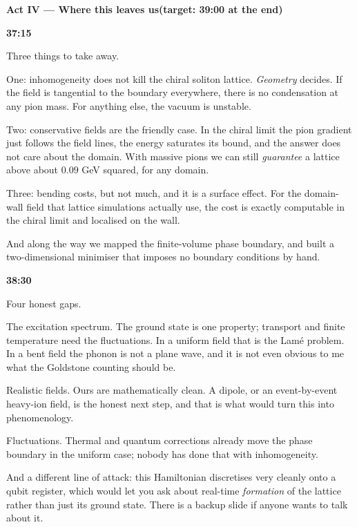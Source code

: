 \documentclass[11pt,a4paper]{article}
\newcommand{\slide}[3]{%
  \par\vspace{4.5mm}%
  \noindent{\color{myblue}\rule{\textwidth}{0.9pt}}\par\vspace{-2.0mm}%
  \noindent{\color{myblue}\bfseries\large #1}%
  \hfill{\color{myorange}\bfseries #2}\par\vspace{0.4mm}%
  \noindent{\color{mygray}\small\itshape #3}\par\vspace{1.6mm}%
}
\newcommand{\act}[1]{\par\vspace{7mm}\noindent
  {\color{myred}\bfseries\Large #1}\par\vspace{-1mm}
  \noindent{\color{myred}\rule{\textwidth}{1.6pt}}\par\vspace{2mm}}
\begin{document}
\act{Act IV --- Where this leaves us\hfill\normalsize\mdseries (target: 39:00 at the end)}

\slide{Summary}{37:15}{1 min 15 s}

Three things to take away.

One: inhomogeneity does not kill the chiral soliton lattice. \emph{Geometry}
decides. If the field is tangential to the boundary everywhere, there is no
condensation at any pion mass. For anything else, the vacuum is unstable.

Two: conservative fields are the friendly case. In the chiral limit the pion
gradient just follows the field lines, the energy saturates its bound, and the
answer does not care about the domain. With massive pions we can still \emph{guarantee}
a lattice above about $0.09$ GeV squared, for any domain.

Three: bending costs, but not much, and it is a surface effect. For the domain-wall
field that lattice simulations actually use, the cost is exactly computable in the
chiral limit and localised on the wall.

And along the way we mapped the finite-volume phase boundary, and built a
two-dimensional minimiser that imposes no boundary conditions by hand.

\slide{What we cannot do yet}{38:30}{1 min}

Four honest gaps.

The excitation spectrum. The ground state is one property; transport and finite
temperature need the fluctuations. In a uniform field that is the Lam\'e problem.
In a bent field the phonon is not a plane wave, and it is not even obvious to me
what the Goldstone counting should be.

Realistic fields. Ours are mathematically clean. A dipole, or an event-by-event
heavy-ion field, is the honest next step, and that is what would turn this into
phenomenology.

Fluctuations. Thermal and quantum corrections already move the phase boundary in the
uniform case; nobody has done that with inhomogeneity.

And a different line of attack: this Hamiltonian discretises very cleanly onto a
qubit register, which would let you ask about real-time \emph{formation} of the
lattice rather than just its ground state. There is a backup slide if anyone wants
to talk about it.
\end{document}
